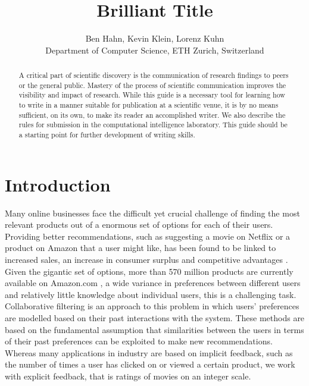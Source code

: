 \documentclass[10pt,conference,compsocconf]{IEEEtran}
\begin{document}
\title{Brilliant Title}

\author{
  Ben Hahn, Kevin Klein, Lorenz Kuhn\\
  Department of Computer Science, ETH Zurich, Switzerland
}

\maketitle

\begin{abstract}
  A critical part of scientific discovery is the
  communication of research findings to peers or the general public.
  Mastery of the process of scientific communication improves the
  visibility and impact of research. While this guide is a necessary
  tool for learning how to write in a manner suitable for publication
  at a scientific venue, it is by no means sufficient, on its own, to
  make its reader an accomplished writer. We also describe the rules
  for submission in the computational intelligence laboratory.
  This guide should be a
  starting point for further development of writing skills.
\end{abstract}

\section{Introduction}

Many online businesses face the difficult yet crucial challenge of finding the most relevant products out of a enormous set of options for each of their users. Providing better recommendations, such as suggesting a movie on Netflix or a product on Amazon that a user might like, has been found to be linked to increased sales, an increase in consumer surplus and competitive advantages \cite{hinz2010impact}.
Given the gigantic set of options, more than 570 million products are currently available on Amazon.com \cite{scrap2018}, a wide variance in preferences between different users and relatively little knowledge about individual users, this is a challenging task. Collaborative filtering \cite{sarwar2001item} is an approach to this problem in which users' preferences are modelled based on their past interactions with the system. These methods are based on the fundamental assumption that similarities between the users in terms of their past preferences can be exploited to make new recommendations. Whereas many applications in industry are based on implicit feedback, such as the number of times a user has clicked on or viewed a certain product, we work with explicit feedback, that is ratings of movies on an integer scale. 
\end{document}

